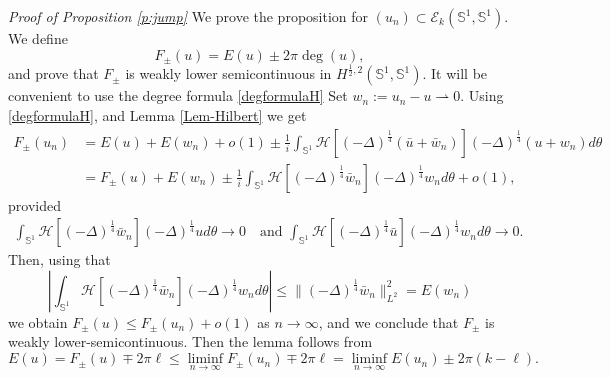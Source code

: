 \documentclass[12pt, a4paper]{article}
\newcommand{\sph}{\mathbb{S}}
\newcommand{\R}{\mathbb{R}}
\renewcommand{\(}{\left(}
\renewcommand{\)}{\right)}
\begin{document}
\noindent\emph{Proof of Proposition \ref{p:jump}}
We prove the proposition for $(u_n)\subset \mathcal E_k(\sph^1,\sph^1)$. We define
$$F_\pm(u)=E(u)\pm 2\pi \deg (u),$$
and prove that $F_\pm$ is weakly lower semicontinuous in $ H^{\frac{1}{2},2}(\sph^1,\sph^1)$.
It will be convenient to use the degree formula \eqref{degformulaH}
Set $w_n:= u_n-u\rightharpoonup 0$. Using \eqref{degformulaH}, and Lemma \ref{Lem-Hilbert} we get
\begin{align*}
F_\pm (u_n)&=E(u)+E(w_n)+o(1) \pm \frac{1}{i}\int_{\sph^1}\mathcal{H}[(-\Delta)^\frac14(\bar u+\bar w_n)](-\Delta)^\frac14(u+w_n)d\theta\\
&=F_\pm (u)+ E(w_n)  \pm \frac{1}{i} \int_{\sph^1}\mathcal{H}[(-\Delta)^\frac14\bar w_n](-\Delta)^\frac14 w_n d\theta+o(1),
\end{align*}   provided \begin{align}\label{zero}\int_{\sph^1}\mathcal{H}[(-\Delta)^\frac14\bar w_n](-\Delta)^\frac14 u d\theta\to0\quad\text{and }\int_{\sph^1}\mathcal{H}[(-\Delta)^\frac14\bar u ](-\Delta)^\frac14 w_n d\theta\to0.\end{align}
Then, using that
$$\left|\int_{\sph^1}\mathcal{H}[(-\Delta)^\frac14\bar w_n](-\Delta)^\frac14 w_n d\theta\right|\le  \|(-\Delta)^\frac14\bar w_n\|_{L^2}^2=E(w_n)$$
we obtain $F_\pm(u)\le F_\pm(u_n)+o(1)$ as $n\to \infty$, and we conclude that $F_\pm$ is weakly lower-semicontinuous. Then the lemma follows from
$$E(u)=F_{\pm}(u)\mp 2\pi \ell \le \liminf_{n\to\infty}F_{\pm}(u_n)\mp2\pi \ell=\liminf_{n\to\infty} E(u_n) \pm 2\pi(k-\ell).$$ 
\end{document}
